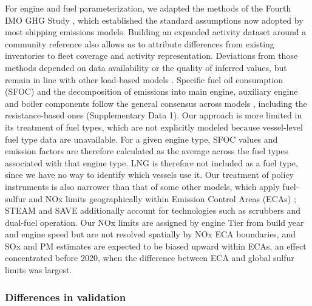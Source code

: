 For engine and fuel parameterization, we adapted the methods of the Fourth IMO GHG Study \cite{fourth2020greenhouse}, which established the standard assumptions now adopted by most shipping emissions models. Building an expanded activity dataset around a community reference also allows us to attribute differences from existing inventories to fleet coverage and activity representation. Deviations from those methods depended on data availability or the quality of inferred values, but remain in line with other load-based models \cite{yiHighresolutionGlobalShipping2025, oecdMaritimeTransportCO2Methodology2025, documentationV2025031Documentation}. Specific fuel oil consumption (SFOC) and the decomposition of emissions into main engine, auxiliary engine and boiler components follow the general consensus across models \cite{fourth2020greenhouse, yiHighresolutionGlobalShipping2025, oecdMaritimeTransportCO2Methodology2025, documentationV2025031Documentation}, including the resistance-based ones \cite{johanssonGlobalAssessmentShipping2017, kramelGlobalShippingEmissions2021} (Supplementary Data 1). Our approach is more limited in its treatment of fuel types, which are not explicitly modeled because vessel-level fuel type data are unavailable. For a given engine type, SFOC values and emission factors are therefore calculated as the average across the fuel types associated with that engine type. LNG is therefore not included as a fuel type, since we have no way to identify which vessels use it. Our treatment of policy instruments is also narrower than that of some other models, which apply fuel-sulfur and NOx limits geographically within Emission Control Areas (ECAs) \cite{johanssonGlobalAssessmentShipping2017, yiHighresolutionGlobalShipping2025, fourth2020greenhouse, documentationV2025031Documentation}; STEAM and SAVE additionally account for technologies such as scrubbers and dual-fuel operation. Our NOx limits are assigned by engine Tier from build year and engine speed but are not resolved spatially by NOx ECA boundaries, and SOx and PM estimates are expected to be biased upward within ECAs, an effect concentrated before 2020, when the difference between ECA and global sulfur limits was largest.

\subsubsection*{Differences in validation}

